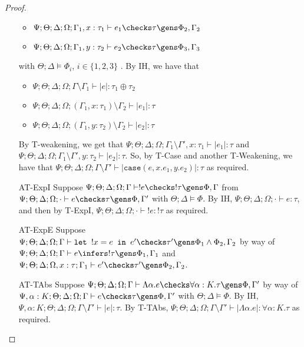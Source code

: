 \begin{proof}
\begin{enumerate}
\begin{itemize}
    \item $\Psi ; \Theta ; \Delta ; \Omega ; \Gamma_1, x: \tau_1 \vdash e_1 \checks \tau \gens \Phi_2,\Gamma_2$
    \item $\Psi ; \Theta ; \Delta ; \Omega ; \Gamma_1, y: \tau_2 \vdash e_2 \checks \tau \gens \Phi_3,\Gamma_3$
  \end{itemize}
  with $\Theta ; \Delta \vDash \Phi_i$, $i \in \{1,2,3\}$ . By IH, we have that
  \begin{itemize}
    \item $\Psi ; \Theta ; \Delta ; \Omega ; \Gamma \setminus \Gamma_1 \vdash |e| : \tau_1 \oplus \tau_2$
    \item $\Psi ; \Theta ; \Delta ; \Omega ; (\Gamma_1, x: \tau_1) \setminus \Gamma_2 \vdash |e_1| : \tau$
    \item $\Psi ; \Theta ; \Delta ; \Omega ; (\Gamma_1, y: \tau_2) \setminus \Gamma_2 \vdash |e_2| : \tau$
  \end{itemize}
  By T-weakening, we get that $\Psi ; \Theta ; \Delta ; \Omega ; \Gamma_1 \setminus \Gamma', x : \tau_1 \vdash |e_1| : \tau$ and $\Psi ; \Theta ; \Delta ; \Omega ; \Gamma_1 \setminus \Gamma', y : \tau_2 \vdash |e_2| : \tau$. So, by T-Case and another T-Weakening, we have that
  $\Psi ; \Theta ; \Delta ; \Omega ; \Gamma \setminus \Gamma' \vdash |\texttt{case}(e,x.e_1,y.e_2)| : \tau$ as required.
  
  \item[AT-ExpI] Suppose $\Psi ; \Theta ; \Delta ; \Omega ; \Gamma \vdash !e \checks !\tau \gens \Phi, \Gamma$ from $\Psi ; \Theta ; \Delta ; \Omega ; \cdot \vdash e \checks \tau \gens \Phi, \Gamma'$ with $\Theta ; \Delta \vDash \Phi$. By IH, $\Psi ; \Theta ; \Delta ; \Omega ; \cdot \vdash e : \tau$, and then by T-ExpI, $\Psi ; \Theta ; \Delta ; \Omega ; \cdot \vdash !e : !\tau$ as required.
  \item[AT-ExpE] Suppose $\Psi ; \Theta ; \Delta ; \Omega ; \Gamma \vdash \texttt{let } !x = e \texttt{ in } e' \checks \tau' \gens \Phi_1 \wedge \Phi_2, \Gamma_2$ by way of $\Psi ; \Theta ; \Delta ; \Omega ; \Gamma \vdash e \infers !\tau \gens \Phi_1,\Gamma_1$ and $\Psi ; \Theta ; \Delta ; \Omega, x : \tau ; \Gamma_1 \vdash e' \checks \tau' \gens \Phi_2,\Gamma_2$. 
  \item[AT-TAbs] Suppose $\Psi ; \Theta ; \Delta ; \Omega ; \Gamma \vdash \Lambda \alpha. e \checks \forall \alpha : K.\tau \gens \Phi,\Gamma'$ by way of $\Psi, \alpha : K ; \Theta ; \Delta ; \Omega ; \Gamma \vdash e \checks \tau \gens \Phi, \Gamma'$ with $\Theta ; \Delta \vDash \Phi$. By IH,  $\Psi, \alpha : K ; \Theta ; \Delta ; \Omega ; \Gamma\setminus \Gamma' \vdash |e| : \tau$. By T-TAbs, $\Psi ; \Theta ; \Delta ; \Omega ; \Gamma \setminus \Gamma' \vdash |\Lambda \alpha. e| : \forall \alpha : K.\tau$ as required.
  

\end{enumerate}
\end{proof}
